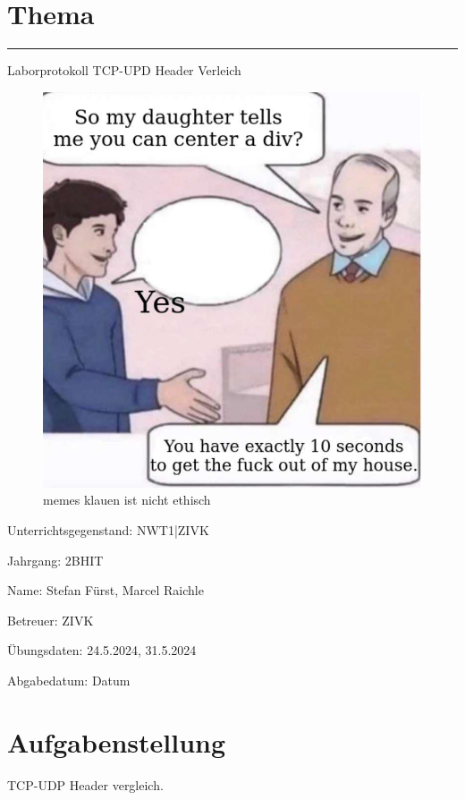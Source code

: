\documentclass[a4paper]{article}
\begin{document}

\pagestyle{oida}
\section*{Thema}
\par\noindent\rule{\textwidth}{0.4pt}

Laborprotokoll
TCP-UPD Header Verleich

\begin{figure}[h]
	\includegraphics[scale=0.6]{images/meme.jpeg}
	\caption{memes klauen ist nicht ethisch}
\end{figure}

\vspace*{\fill}
Unterrichtsgegenstand:	NWT1|ZIVK

Jahrgang:	2BHIT

Name:	Stefan Fürst, Marcel Raichle

Betreuer: 	ZIVK

Übungsdaten:	24.5.2024, 31.5.2024

Abgabedatum:	Datum


\newpage
\tableofcontents

\newpage

\section{Aufgabenstellung}
TCP-UDP Header vergleich.
\end{document}
